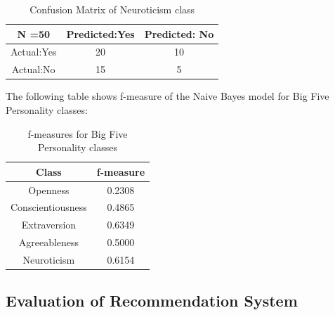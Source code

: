 \documentclass[conference]{IEEEtran}
\begin{document}
\FloatBarrier
\begin{table}[H]
\centering
 \caption{Confusion Matrix of Neuroticism class}

\begin{tabular}{ |c|c|c| }
 \hline
 N =50 & Predicted:Yes & Predicted: No \\
 \hline
 Actual:Yes&20 & 10 \\
 \hline
 Actual:No&15 & 5 \\
 \hline
\end{tabular}
\end{table}

The following table shows f-measure of the Naive Bayes model for Big Five Personality classes:
\FloatBarrier
\begin{table}[H]
\centering
 \caption{f-measures for Big Five Personality classes}

\begin{tabular}{ |c|c| }
 \hline
 Class & f-measure \\
 \hline
 Openness&0.2308\\
 \hline
 Conscientiousness&0.4865 \\
 \hline
 Extraversion&0.6349 \\
 \hline
 Agreeableness&0.5000 \\
 \hline
 Neuroticism&0.6154 \\
 \hline
\end{tabular}
\end{table}

\subsection{Evaluation of Recommendation System}
\end{document}
